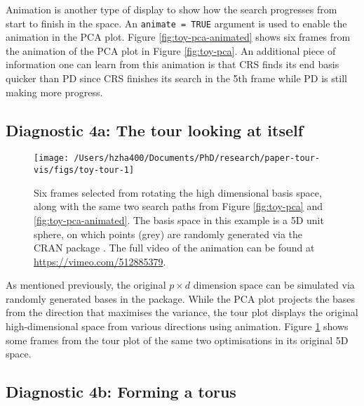 Animation is another type of display to show how the search progresses
from start to finish in the space. An \texttt{animate\ =\ TRUE} argument
is used to enable the animation in the PCA plot. Figure
\ref{fig:toy-pca-animated} shows six frames from the animation of the
PCA plot in Figure \ref{fig:toy-pca}. An additional piece of information
one can learn from this animation is that CRS finds its end basis
quicker than PD since CRS finishes its search in the 5th frame while PD
is still making more progress.

\hypertarget{diagnostic-4a-the-tour-looking-at-itself}{%
\subsection{Diagnostic 4a: The tour looking at
itself}\label{diagnostic-4a-the-tour-looking-at-itself}}

\begin{Schunk}
\begin{figure}

{\centering \texttt{[image: /Users/hzha400/Documents/PhD/research/paper-tour-vis/figs/toy-tour-1]} 

}

\caption{Six frames selected from rotating the high dimensional basis space, along with the same two search paths from Figure \ref{fig:toy-pca} and \ref{fig:toy-pca-animated}. The basis space in this example is a 5D unit sphere, on which points (grey) are randomly generated via the CRAN package . The full video of the animation can be found at \url{https://vimeo.com/512885379}.}\label{fig:toy-tour}
\end{figure}
\end{Schunk}

As mentioned previously, the original \(p \times d\) dimension space can
be simulated via randomly generated bases in the 
\citep{geozoo} package. While the PCA plot projects the bases from the
direction that maximises the variance, the tour plot displays the
original high-dimensional space from various directions using animation.
Figure \ref{fig:toy-tour} shows some frames from the tour plot of the
same two optimisations in its original 5D space.

\hypertarget{diagnostic-4b-forming-a-torus}{%
\subsection{Diagnostic 4b: Forming a
torus}\label{diagnostic-4b-forming-a-torus}}

